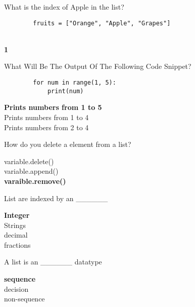 \documentclass{exam}
\begin{document}
\begin{questions}
    \question What is the index of Apple in the list?

    \begin{verbatim}
        fruits = ["Orange", "Apple", "Grapes"]
    \end{verbatim}
    
    \begin{oneparchoices}
         \\
        \choice \textbf{1} \\
    \end{oneparchoices}

    \question What Will Be The Output Of The Following Code Snippet?

    \begin{verbatim}
        for num in range(1, 5):
            print(num)
    \end{verbatim}
    \begin{oneparchoices}
        \choice \textbf{Prints numbers from 1 to 5} \\
        \choice Prints numbers from 1 to 4 \\
        \choice Prints numbers from 2 to 4
    \end{oneparchoices}

    \question How do you delete a element from a list?
     
    \begin{oneparchoices}
        \choice variable.delete() \\
        \choice variable.append() \\
        \choice \textbf{varaible.remove()}
    \end{oneparchoices}

    \question List are indexed by an \_\_\_\_\_\_

    \begin{oneparchoices}
        \choice \textbf{Integer} \\
        \choice Strings \\
        \choice decimal \\
        \choice fractions
    \end{oneparchoices}

    \question A list is an \_\_\_\_\_\_ datatype

    \begin{oneparchoices}
        \choice \textbf{sequence} \\
        \choice decision \\
        \choice non-sequence
    \end{oneparchoices}


\end{questions}
\end{document}
